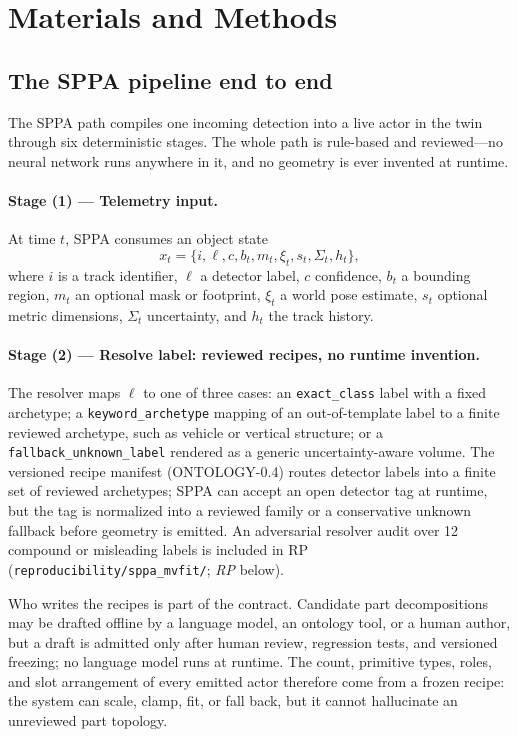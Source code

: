 \documentclass[11pt,a4paper]{article}
\begin{document}
\section{Materials and Methods}

\subsection{The SPPA pipeline end to end}
\label{sec:architecture}

The SPPA path compiles one incoming detection into a live actor in the twin
through six deterministic stages. The whole
path is rule-based and reviewed---no neural network runs anywhere in it, and
no geometry is ever invented at runtime.

\paragraph{Stage (1) --- Telemetry input.}
At time \(t\), SPPA consumes an object state
\[
x_t = \{i, \ell, c, b_t, m_t, \xi_t, s_t, \Sigma_t, h_t\},
\]
where \(i\) is a track identifier, \(\ell\) a detector label, \(c\) confidence,
\(b_t\) a bounding region, \(m_t\) an optional mask or footprint, \(\xi_t\) a
world pose estimate, \(s_t\) optional metric dimensions, \(\Sigma_t\)
uncertainty, and \(h_t\) the track history.

\paragraph{Stage (2) --- Resolve label: reviewed recipes, no runtime invention.}
The resolver maps \(\ell\) to one of
three cases: an \texttt{exact\_class} label with a fixed archetype; a
\texttt{keyword\_archetype} mapping of an out-of-template label to a finite
reviewed archetype, such as vehicle or vertical structure; or a
\texttt{fallback\_unknown\_label} rendered as a generic uncertainty-aware
volume. The versioned recipe manifest (ONTOLOGY-0.4) routes detector labels into a
finite set of reviewed archetypes; SPPA can accept an open detector tag at runtime, but the tag is
normalized into a reviewed family or a conservative unknown fallback before
geometry is emitted. An adversarial resolver audit over 12 compound or
misleading labels is included
in RP (\texttt{reproducibility/sppa\_mvfit/};
\emph{RP} below).

Who writes the recipes is part of the contract. Candidate part
decompositions may be drafted offline by a language model, an ontology tool,
or a human author, but a draft is admitted only after human review,
regression tests, and versioned freezing; no language model runs at runtime.
The count, primitive types, roles,
and slot arrangement of every emitted actor therefore come from a frozen
recipe: the system can scale, clamp, fit, or fall back, but it cannot
hallucinate an unreviewed part topology.
\end{document}
